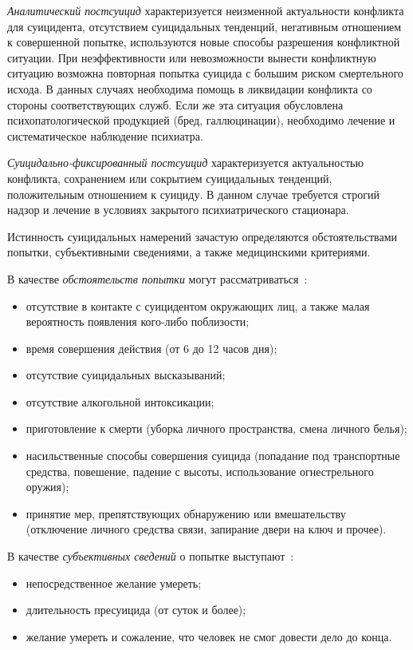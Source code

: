 \textit{Аналитический постсуицид} характеризуется неизменной актуальности конфликта для суицидента, отсутствием суицидальных тенденций, негативным отношением к совершенной попытке, используются новые способы разрешения конфликтной ситуации. При неэффективности или невозможности вынести конфликтную ситуацию возможна повторная попытка суицида с большим риском смертельного исхода. В данных случаях необходима помощь в ликвидации конфликта со стороны соответствующих служб. Если же эта ситуация обусловлена психопатологической продукцией (бред, галлюцинации), необходимо лечение и систематическое наблюдение психиатра.

\textit{Суицидально-фиксированный постсуицид} характеризуется актуальностью конфликта, сохранением или сокрытием суицидальных тенденций, положительным отношением к суициду. В данном случае требуется строгий надзор и лечение в условиях закрытого психиатрического стационара.

Истинность суицидальных намерений зачастую определяются обстоятельствами попытки, субъективными сведениями, а также медицинскими критериями.~\cite{starsen}

В качестве \textit{обстоятельств попытки} могут рассматриваться~\cite{starsen}:

\begin{itemize}
	\item отсутствие в контакте с суицидентом окружающих лиц, а также малая вероятность появления кого-либо поблизости;
	\item время совершения действия (от 6 до 12 часов дня);
	\item отсутствие суицидальных высказываний;
	\item отсутствие алкогольной интоксикации;
	\item приготовление к смерти (уборка личного пространства, смена личного белья);
	\item насильственные способы совершения суицида (попадание под транспортные средства, повешение, падение с высоты, использование огнестрельного оружия);
	\item принятие мер, препятствующих обнаружению или вмешательству (отключение личного средства связи, запирание двери на ключ и прочее).
\end{itemize}

В качестве \textit{субъективных сведений} о попытке выступают~\cite{starsen}:

\begin{itemize}
	\item непосредственное желание умереть;
	\item длительность пресуицида (от суток и более);
	\item желание умереть и сожаление, что человек не смог довести дело до конца.
\end{itemize}

